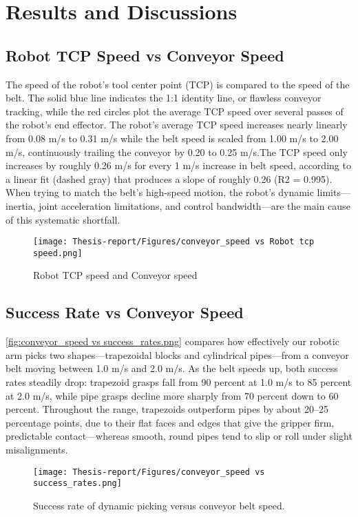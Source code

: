 \documentclass[12pt]{article}
\begin{document}
\newpage
\section{Results and Discussions}
\subsection{Robot TCP Speed vs Conveyor Speed}
The speed of the robot's tool center point (TCP) is compared to the speed of the belt.
 The solid blue line indicates the 1:1 identity line, or flawless conveyor tracking, while the red circles plot the average TCP speed over several passes of the robot's end effector.  The robot's average TCP speed increases nearly linearly from 0.08 m/s to 0.31 m/s while the belt speed is scaled from 1.00 m/s to 2.00 m/s, continuously trailing the conveyor by 0.20 to 0.25 m/s.The TCP speed only increases by roughly 0.26 m/s for every 1 m/s increase in belt speed, according to a linear fit (dashed gray) that produces a slope of roughly 0.26 (R2 = 0.995).  When trying to match the belt's high-speed motion, the robot's dynamic limits—inertia, joint acceleration limitations, and control bandwidth—are the main cause of this systematic shortfall.
 
\begin{figure}[h]
    \centering
    \texttt{[image: Thesis-report/Figures/conveyor\_speed vs Robot tcp speed.png]}
    \caption{Robot TCP speed and Conveyor speed \cite{ref22}}
    \label{fig1.Photoneo Cmaera}
\end{figure}


\subsection{Success Rate vs Conveyor Speed}
 \autoref{fig:conveyor_speed vs success_rates.png} compares how effectively our robotic arm picks two shapes—trapezoidal blocks and cylindrical pipes—from a conveyor belt moving between 1.0 m/s and 2.0 m/s. As the belt speeds up, both success rates steadily drop: trapezoid grasps fall from 90 percent at 1.0 m/s to 85 percent at 2.0 m/s, while pipe grasps decline more sharply from 70 percent down to 60 percent. Throughout the range, trapezoids outperform pipes by about 20–25 percentage points, due to their flat faces and edges that give the gripper firm, predictable contact—whereas smooth, round pipes tend to slip or roll under slight misalignments.
\begin{figure}[h]
    \centering
    \texttt{[image: Thesis-report/Figures/conveyor\_speed vs success\_rates.png]}
    \caption{Success rate of dynamic picking versus conveyor belt speed. \cite{ref22}}
    \label{fig:conveyor_speed vs success_rates.png}
\end{figure}
\end{document}
